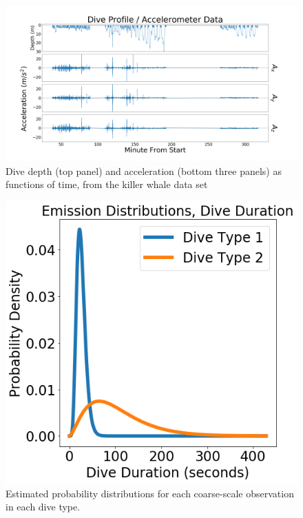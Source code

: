 \begin{figure}[ht]
	\centering
	\includegraphics[width=5in]{../Plots/raw_data.png}
	\caption{Dive depth (top panel) and acceleration (bottom three panels) as functions of time, from the killer whale data set}
	\label{fig:data}
\end{figure}

\begin{figure}[ht]
	\centering
	\includegraphics[width=5in]{../Plots/CarHHMM2-coarse-emissions.png}
	\caption{Estimated probability distributions for each coarse-scale observation in each dive type.}
	\label{fig:coarse_emis}
\end{figure}

